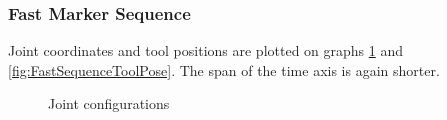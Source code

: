 \documentclass[]{scrartcl}
\begin{document}
\subsubsection*{Fast Marker Sequence}
Joint coordinates and tool positions are plotted on graphs \ref{fig:FastSequenceJoints} and \ref{fig:FastSequenceToolPose}. The span of the time axis is again shorter.

\begin{figure}[!htp]
	\hfill
	\caption{Joint configurations}
	\label{fig:FastSequenceJoints}
\end{figure}
\end{document}
